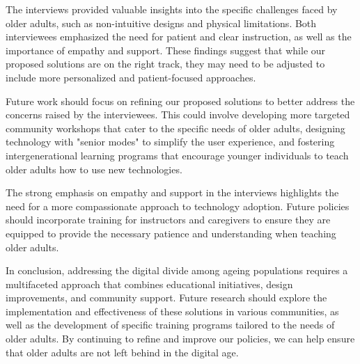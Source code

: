 \documentclass{article} %
\begin{document}
The interviews provided valuable insights into the specific challenges faced by older adults, such as non-intuitive designs and physical limitations. Both interviewees emphasized the need for patient and clear instruction, as well as the importance of empathy and support. These findings suggest that while our proposed solutions are on the right track, they may need to be adjusted to include more personalized and patient-focused approaches.

Future work should focus on refining our proposed solutions to better address the concerns raised by the interviewees. This could involve developing more targeted community workshops that cater to the specific needs of older adults, designing technology with "senior modes" to simplify the user experience, and fostering intergenerational learning programs that encourage younger individuals to teach older adults how to use new technologies.

The strong emphasis on empathy and support in the interviews highlights the need for a more compassionate approach to technology adoption. Future policies should incorporate training for instructors and caregivers to ensure they are equipped to provide the necessary patience and understanding when teaching older adults.

In conclusion, addressing the digital divide among ageing populations requires a multifaceted approach that combines educational initiatives, design improvements, and community support. Future research should explore the implementation and effectiveness of these solutions in various communities, as well as the development of specific training programs tailored to the needs of older adults. By continuing to refine and improve our policies, we can help ensure that older adults are not left behind in the digital age.



\end{document}
